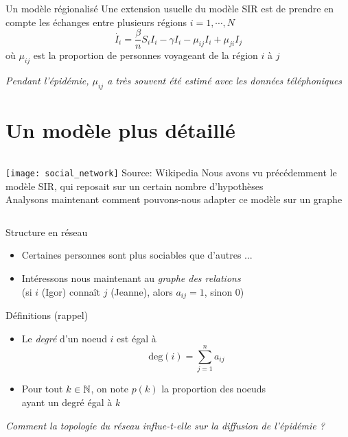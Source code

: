 \documentclass[10pt]{beamer}
\begin{document}
\begin{frame}{Un modèle régionalisé}
  Une extension usuelle du modèle SIR est de prendre en compte les échanges
  entre plusieurs régions $i = 1, \cdots, N$
  \[
    \dot{I_i} = \frac{\beta}{n} S_i I_i - \gamma I_i - \mu_{ij} I_i +
    \mu_{ji} I_j
  \]
  où $\mu_{ij}$ est la proportion de personnes voyageant de la région $i$ à $j$

  \vspace{1cm}

  \pause
  \emph{
  Pendant l'épidémie, $\mu_{ij}$ a très souvent été estimé avec les données
  téléphoniques
  }
\end{frame}

\section{Un modèle plus détaillé}

\begin{frame}{}
  \begin{columns}
    \texttt{[image: social\_network]}
    {\tiny
      Source: Wikipedia
    }
    Nous avons vu précédemment le modèle SIR,
    qui reposait sur un certain nombre d'hypothèses\\[1cm]

    Analysons maintenant comment pouvons-nous adapter ce modèle sur un graphe
  \end{columns}
\end{frame}

\begin{frame}{Structure en réseau}

  \begin{itemize}
    \item Certaines personnes sont plus sociables que d'autres ...
    \item Intéressons nous maintenant au \emph{graphe des relations} \\
      (si $i$ (Igor) connaît $j$ (Jeanne), alors $a_{ij} = 1$, sinon $0$)
  \end{itemize}

  \begin{block}{Définitions (rappel)}
    \begin{itemize}
      \item Le \emph{degré} d'un noeud $i$ est égal à
        \[
          \text{deg}(i) = \sum_{j=1}^n a_{ij}
        \]
        \vspace{-.4cm}
      \item Pour tout $k \in \mathbb{N}$, on note $p(k)$ la proportion des noeuds \\
        ayant un degré égal à $k$
    \end{itemize}
  \end{block}

  \emph{Comment la topologie du réseau influe-t-elle sur la diffusion de l'épidémie ?}
\end{frame}
\end{document}

